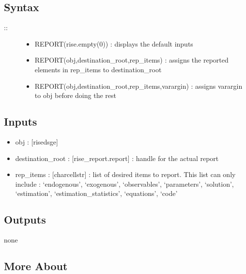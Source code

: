 \documentclass[letterpaper,10pt,english]{sphinxmanual}
\begin{document}
\subsection{Syntax}
\label{classes/models/@dsge/dsge:id147}\begin{description}
\item[{::}] \leavevmode\begin{itemize}
\item {} 
REPORT(rise.empty(0)) : displays the default inputs

\item {} 
REPORT(obj,destination\_root,rep\_items) : assigns the reported
elements in rep\_items to destination\_root

\item {} 
REPORT(obj,destination\_root,rep\_items,varargin) : assigns varargin to
obj before doing the rest

\end{itemize}

\end{description}


\subsection{Inputs}
\label{classes/models/@dsge/dsge:id148}\begin{itemize}
\item {} 
obj : {[}rise\textbar{}dsge{]}

\item {} 
destination\_root : {[}rise\_report.report{]} : handle for the actual report

\item {} 
rep\_items : {[}char\textbar{}cellstr{]} : list of desired items to report. This list
can only include : `endogenous', `exogenous', `observables',
`parameters', `solution', `estimation', `estimation\_statistics',
`equations', `code'

\end{itemize}


\subsection{Outputs}
\label{classes/models/@dsge/dsge:id149}
none


\subsection{More About}
\label{classes/models/@dsge/dsge:id150}
\end{document}
